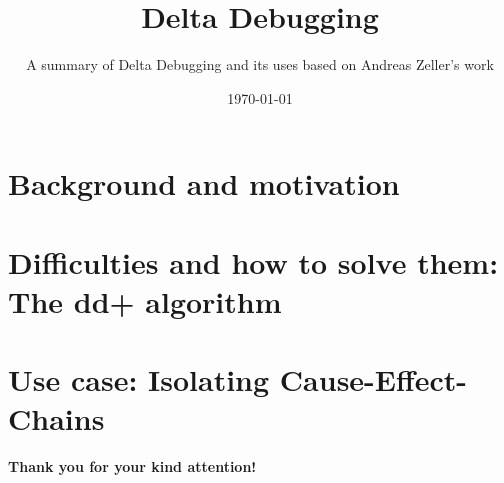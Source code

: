 


\title[Delta Debugging]{Delta Debugging}
\subtitle{A summary of Delta Debugging and its uses based on Andreas Zeller's work}
\date{\today}




\titleframe

\section{Background and motivation}


\section{Difficulties and how to solve them: The dd+ algorithm}



\section{Use case: Isolating Cause-Effect-Chains}


\begin{frame}
	\begin{center}
		\large \textbf{Thank you for your kind attention!}
	\end{center}
\end{frame}

%

%

